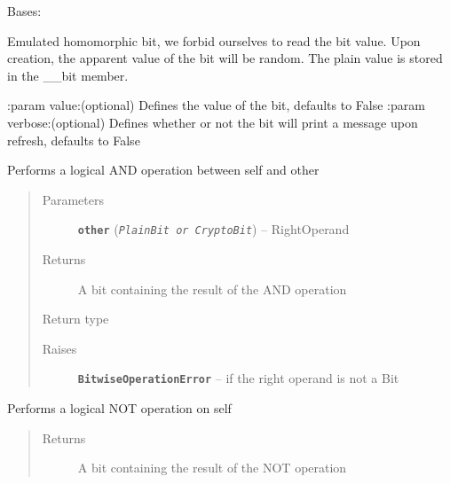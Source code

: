 \documentclass[letterpaper,10pt,english]{sphinxmanual}
\begin{document}

\begin{fulllineitems}
\label{datatypes.bits:datatypes.bits.Bit.CryptoBit}
Bases: {\hyperref[datatypes.bits:datatypes.bits.Bit.Bit]{}}

Emulated homomorphic bit, we forbid ourselves to read the bit value.
Upon creation, the apparent value of the bit will be random.
The plain value is stored in the \_\_bit member.

:param value:(optional) Defines the value of the bit, defaults to False
:param verbose:(optional) Defines whether or not the bit will print a message upon refresh, defaults to False

\begin{fulllineitems}
\label{datatypes.bits:datatypes.bits.Bit.CryptoBit.AND}
Performs a logical AND operation between self and other
\begin{quote}\begin{description}
\item[{Parameters}] \leavevmode
\textbf{\texttt{other}} (\emph{\texttt{PlainBit or CryptoBit}}) -- RightOperand

\item[{Returns}] \leavevmode
A bit containing the result of the AND operation

\item[{Return type}] \leavevmode
{\hyperref[datatypes.bits:datatypes.bits.Bit.CryptoBit]{}}

\item[{Raises}] \leavevmode
\textbf{\texttt{BitwiseOperationError}} -- if the right operand is not a Bit

\end{description}\end{quote}

\end{fulllineitems}


\begin{fulllineitems}
\label{datatypes.bits:datatypes.bits.Bit.CryptoBit.NOT}
Performs a logical NOT operation on self
\begin{quote}\begin{description}
\item[{Returns}] \leavevmode
A bit containing the result of the NOT operation


\end{description}
\end{quote}
\end{fulllineitems}
\end{fulllineitems}
\end{document}
